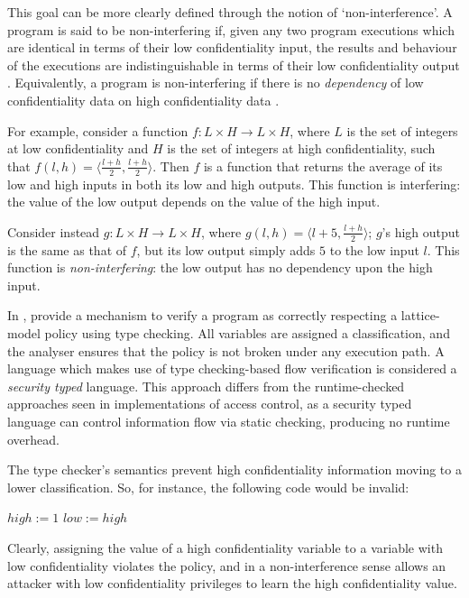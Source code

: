 This goal can be more clearly defined through the notion of `non-interference'. A program is said to be non-interfering if, given any two program executions which are identical in terms of their low confidentiality input, the results and behaviour of the executions are indistinguishable in terms of their low confidentiality output \cite{sabelfeld2003if}. Equivalently, a program is non-interfering if there is no \textit{dependency} of low confidentiality data on high confidentiality data \cite{cohen1977declassification}.

For example, consider a function $ f: L \times H \rightarrow L \times H $, where $ L $ is the set of integers at low confidentiality and $ H $ is the set of integers at high confidentiality, such that $ f(l, h) = \langle \frac{l + h}{2}, \frac{l + h}{2} \rangle $. Then $ f $ is a function that returns the average of its low and high inputs in both its low and high outputs. This function is interfering: the value of the low output depends on the value of the high input.

Consider instead $ g: L \times H \rightarrow L \times H $, where $ g(l, h) = \langle l + 5, \frac{l + h}{2} \rangle $; $ g $'s high output is the same as that of $ f $, but its low output simply adds $ 5 $ to the low input $ l $. This function is \textit{non-interfering}: the low output has no dependency upon the high input.

In , \citeauthor{denning1977certification} \cite{denning1977certification} provide a mechanism to verify a program as correctly respecting a lattice-model policy using type checking. All variables are assigned a classification, and the analyser ensures that the policy is not broken under any execution path. A language which makes use of type checking-based flow verification is considered a \textit{security typed} language. This approach differs from the runtime-checked approaches seen in implementations of access control, as a security typed language can control information flow via static checking, producing no runtime overhead.

The type checker's semantics prevent high confidentiality information moving to a lower classification. So, for instance, the following code would be invalid:

\begin{algorithmic}
\State $ high := 1 $
\State $ low := high $
\end{algorithmic}

Clearly, assigning the value of a high confidentiality variable to a variable with low confidentiality violates the policy, and in a non-interference sense allows an attacker with low confidentiality privileges to learn the high confidentiality value.

